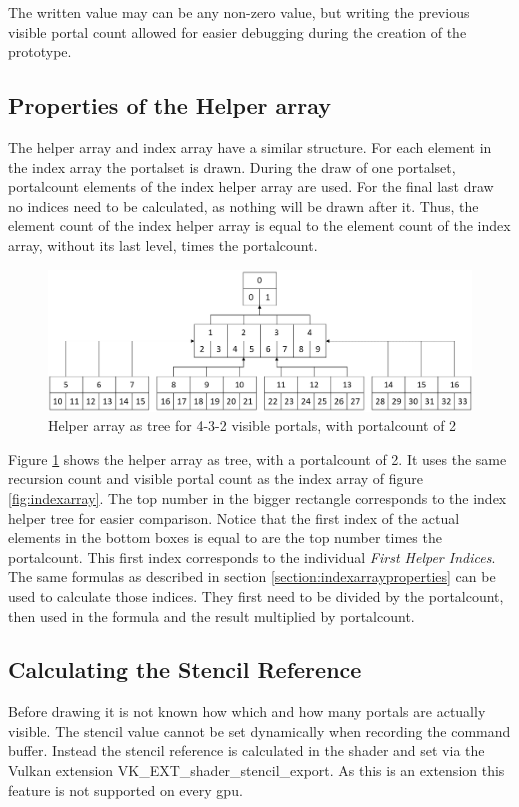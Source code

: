 The written value may can be any non-zero value, but writing the previous visible portal count allowed for easier debugging during the creation of the prototype.

\subsection{Properties of the Helper array}
\label{section:helperarrayproperties}
The helper array and index array have a similar structure. For each element in the index array the \gls{portalset} is drawn. During the draw of one \gls{portalset}, \gls{portalcount} elements of the index helper array are used. For the final last draw no indices need to be calculated, as nothing will be drawn after it. Thus, the element count of the index helper array is equal to the element count of the index array, without its last level, times the \gls{portalcount}.

\begin{figure}[h]
	\includegraphics[width=\linewidth]{images/helperarray.png}
	\caption{Helper array as tree for 4-3-2 visible portals, with \gls{portalcount} of 2}
	\label{fig:helperarray}
\end{figure}

Figure \ref{fig:helperarray} shows the helper array as tree, with a \gls{portalcount} of 2. It uses the same recursion count and visible portal count as the index array of figure \ref{fig:indexarray}. The top number in the bigger rectangle corresponds to the index helper tree for easier comparison. Notice that the first index of the actual elements in the bottom boxes is equal to are the top number times the \gls{portalcount}. This first index corresponds to the individual \textit{First Helper Indices}. The same formulas as described in section \ref{section:indexarrayproperties} can be used to calculate those indices. They first need to be divided by the \gls{portalcount}, then used in the formula and the result multiplied by \gls{portalcount}.


\subsection{Calculating the Stencil Reference}
Before drawing it is not known how which and how many portals are actually visible. The stencil value cannot be set dynamically when recording the command buffer. Instead the stencil reference is calculated in the shader and set via the Vulkan extension VK\_EXT\_shader\_stencil\_export. As this is an extension this feature is not supported on every \gls{gpu}.


